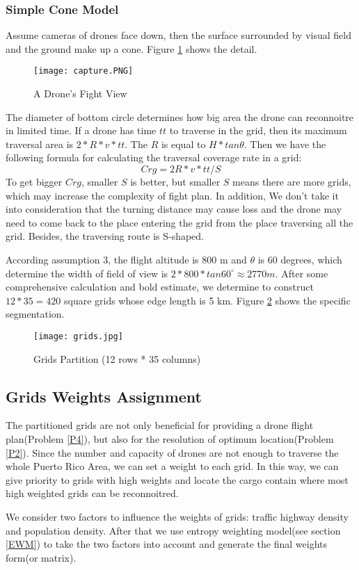 \documentclass{mcmthesis}
\begin{document}
   	\subsubsection{Simple Cone Model }
   	Assume cameras of drones face down, then the surface surrounded by visual field and the ground make up a cone. Figure \ref{1} shows the detail\cite{1}.
   	 \begin{figure}[H]                                         
   		\centering
   		\texttt{[image: capture.PNG]}      
   		\caption{ A Drone's Fight View }                            
   		\label{1}   
   	\end{figure} 
   	The diameter of bottom circle determines how big area the drone can reconnoitre in limited time. If a drone has time $tt$ to traverse in the grid, then its maximum traversal area is $2*R*v*tt$. The $R$ is equal to $H*tan\theta $. Then we have the following formula for calculating the traversal coverage rate in a grid:
   	\begin{equation} 
   			Crg=2R*v*tt/S 
   	\end{equation}
   	To get bigger $Crg$, smaller $S$ is better, but smaller $S$ means there are more grids, which may increase the complexity of fight plan. 
   	In addition, We don't take it into consideration that the turning distance may cause loss and the drone may need to come back to the place entering the grid from the place traversing all the grid. Besides, the traversing route is S-shaped.\par
   	According assumption 3, the flight altitude is 800 m and $\theta$ is 60 degrees, which determine the width of field of view is $2*800* tan 60^\circ \approx 2770 m.$ 
   	After some comprehensive calculation and bold estimate, we determine to construct $12*35=420$ square grids whose edge length is 5 km. Figure \ref{gp} shows the specific segmentation.
   	    \begin{figure}[H]                                         
   		\centering
   		\texttt{[image: grids.jpg]}      
   		\caption{Grids Partition (12 rows * 35 columns) }                            
   		\label{gp}                                          
   	\end{figure}
   
   \subsection{Grids Weights Assignment}
   The partitioned grids are not only beneficial for providing a drone flight plan(Problem \ref{P4}), but also for the resolution of optimum location(Problem \ref{P2}). Since the number and capacity of drones are not enough to traverse the whole Puerto Rico Area, we can set a weight to each grid. In this way, we can give priority to grids with high weights and locate the cargo contain where most high weighted grids can be reconnoitred.\par
   We consider two factors to influence the weights of grids: traffic highway density and population density. After that we use entropy weighting model(see section \ref{EWM}) to take the two factors into account and generate the final weights form(or matrix).
\end{document}
